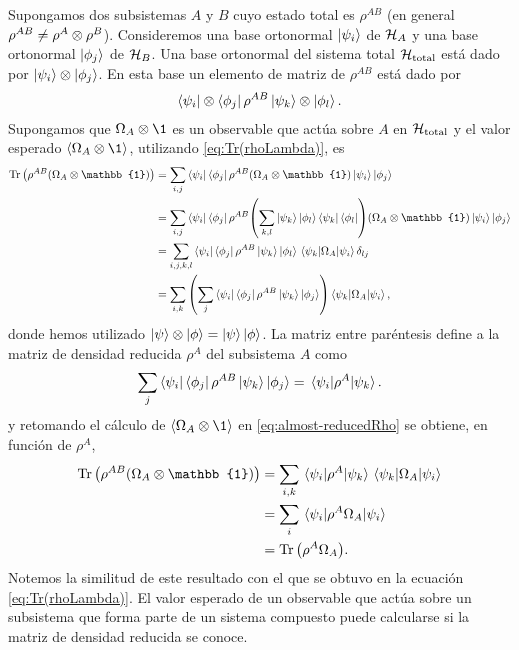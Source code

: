 Supongamos dos subsistemas $A$ y $B$ cuyo estado total es 
$\rho^{AB}$ (en general $\rho^{AB}\neq \rho^A\otimes \rho^B$). 
Consideremos una base ortonormal $\ket{\psi_i}$ de $\mathcal{H}_A$ y una 
base ortonormal $\ket{\phi_j}$ de $\mathcal{H}_B$. Una base ortonormal 
del sistema total $\mathcal{H}_{\text{total}}$ está dado 
por $\ket{\psi_i}\otimes \ket{\phi_j}$.
En esta base un elemento de matriz de $\rho^{AB}$ está dado por
\begin{align}
	\bra{\psi_i}\otimes\bra{\phi_j}\rho^{AB}\ket{\psi_k}\otimes\ket{\phi_l}.
\end{align}
Supongamos que $\Omega_A\ot \1$ es un observable que actúa sobre $A$
en $\mathcal{H}_{\text{total}}$ y el valor esperado 
$\expval{\Omega_A\ot \1}$, utilizando \eqref{eq:Tr(rhoLambda)}, es
\begin{align}
	\Tr \qty(\rho^{AB}\qty(\Omega_A\ot \mathbb{1})) &= \sum _{i,j} 
	\bra{\psi_i}\bra{\phi_j}\rho^{AB}\qty(\Omega_A\ot \mathbb{1})
	\ket{\psi_i}\ket{\phi_j} 
	\nonumber\\
	&= \sum _{i,j} 
	\bra{\psi_i} \bra{\phi_j}\rho^{AB}
	\qty(\sum _{k,l} \ket{\psi_k} \ket{\phi_l} \bra{\psi_k}\bra{\phi_l} )
	\qty(\Omega_A\ot \mathbb{1})\ket{\psi_i} \ket{\phi_j}\nonumber\\
	&= \sum _{i,j,k,l} 
	\bra{\psi_i} \bra{\phi_j}\rho^{AB}\ket{\psi_k} \ket{\phi_l}
	\matrixel{\psi_k}{\Omega_A}{\psi_i}\delta _{lj}\nonumber\\
	&= \sum_{i,k}\qty(\sum _j 
	\bra{\psi_i} \bra{\phi_j}\rho^{AB}\ket{\psi_k} \ket{\phi_j})
	\matrixel{\psi_k}{\Omega_A}{\psi_i},
	\label{eq:almost-reducedRho}
\end{align}
donde hemos utilizado $\ket{\psi}\otimes\ket{\phi}=\ket{\psi}\ket{\phi}$.
La matriz entre paréntesis define a la matriz de densidad
reducida $\rho^A$ del subsistema $A$ como~\cite{chandra2013quantum}
\begin{align}
	\sum _j \bra{\psi_i}\bra{\phi_j}\rho^{AB}\ket{\psi_k}\ket{\phi_j}
	= \matrixel{\psi_i}{\rho^A}{\psi_k}.
	\label{eq:reducedRho-def1}
\end{align}
y retomando el cálculo de $\expval{\Omega_A\ot \1}$
en \eqref{eq:almost-reducedRho} se obtiene, en función 
de $\rho^A$,
\begin{align}
	\Tr \qty(\rho^{AB}\qty(\Omega_A\ot \mathbb{1}))&= \sum _{i,k}\nonumber
	\matrixel{\psi_i}{\rho^A}{\psi_k} \matrixel{\psi_k}{\Omega_A}{\psi_i}
	\nonumber\\
	&= \sum_i \matrixel{\psi_i}{\rho^A\Omega_A}{\psi_i}\nonumber\\
	&= \Tr \qty(\rho^A\Omega_A). \label{eq:reduced-works}
\end{align}
Notemos la similitud de este resultado con el que se obtuvo en la ecuación
\eqref{eq:Tr(rhoLambda)}. El valor esperado de un observable que actúa 
sobre un subsistema que forma parte de un sistema compuesto puede 
calcularse si la matriz de densidad reducida se conoce.

